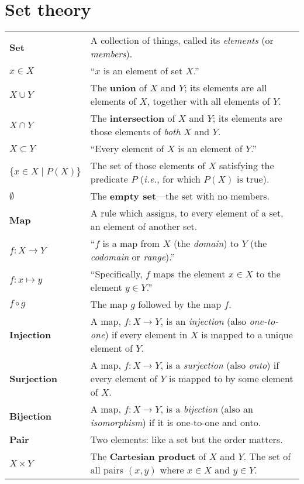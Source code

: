 \documentclass[10pt, a4paper, twocolumn]{article}
\newcommand{\defn}[1]{\textbf{\textsf{#1}}}
\begin{document}
\section{Set theory}
\begin{tabularx}{\columnwidth}{@{}p{}>{\raggedright\arraybackslash}X@{}}
  \toprule
  \defn{Set} & A collection of things, called its \emph{elements} (or \emph{members}). \\

  $x \in X$    & ``$x$ is an element of set $X$.'' \\

  $X\cup Y$     & The \defn{union} of $X$ and $Y$; its elements are all
  elements of $X$, together with all elements of $Y$. \\

  $X\cap Y$     & The \defn{intersection} of $X$ and $Y$; its elements are
  those elements of \emph{both} $X$ and $Y$. \\

  $X \subset Y$    & ``Every element of $X$ is an element of $Y$.''\\

  $\{x\in X\mid P(X)\}$ & The set of those elements of $X$ satisfying the
  predicate $P$ (\textit{i.e.}, for which $P(X)$ is true). \\

  $\emptyset$        & The \defn{empty set}---the set with no members. \\
  \defn{Map} & A rule which assigns, to every element of a set, an element of
  another set. \\

  $f:X\to Y$   & ``$f$ is a map from $X$ (the \emph{domain}) to $Y$ (the
  \emph{codomain} or \emph{range}).'' \\

  $f:x \mapsto y$  & ``Specifically, $f$ maps the element $x \in X$ to the
  element $y \in Y$.'' \\
  $f \circ g$    & The map $g$ followed by the map $f$. \\

  \defn{Injection} & A map, $f:X \to Y$, is an \emph{injection} (also \emph{one-to-one}) if every element in $X$ is mapped to a unique element of $Y$. \\

  \defn{Surjection} & A map, $f:X \to Y$, is a \emph{surjection} (also \emph{onto}) if every element of $Y$ is mapped to by some element of $X$. \\

  \defn{Bijection} & A map, $f:X \to Y$, is a \emph{bijection} (also an \emph{isomorphism}) if it is one-to-one and onto. \\ 
  
  \defn{Pair} & Two elements: like a set but the order matters. \\
  
  $X\times Y$      & The \defn{Cartesian product} of $X$ and $Y$. The set
  of all pairs $(x,y)$ where $x\in X$ and $y \in Y$. \\
\end{tabularx}
\end{document}
